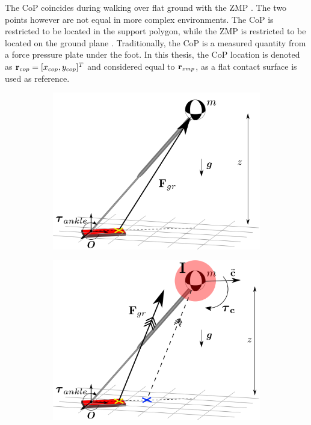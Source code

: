 The \ac{CoP} coincides during walking over flat ground with the \ac{ZMP} \cite{vukobratovic2004zero}. The two points however are not equal in more complex environments. The \ac{CoP} is restricted to be located in the support polygon, while the \ac{ZMP} is restricted to be located on the ground plane  \cite{sardain2004forces}. Traditionally, the \ac{CoP} is a measured quantity from a force pressure plate under the foot. In this thesis, the \ac{CoP} location is denoted as $\mathbf{r}_{cop} = [x_{cop}, y_{cop}]^T$ and considered equal to $\mathbf{r}_{zmp}$, as a flat contact surface is used as reference.
\begin{figure}
\centering
\begin{subfigure}{0.49\textwidth}
\centering
\includegraphics[width=.9\linewidth]{STYLESTUFF/3DCoPviz.png}
\caption{}
\label{fig:3dlipfoot}
\end{subfigure}
\begin{subfigure}{0.49\textwidth}
\centering
\includegraphics[width=.9\linewidth]{STYLESTUFF/3DCMPCoPviz.png}	

\end{subfigure}
\end{figure}
